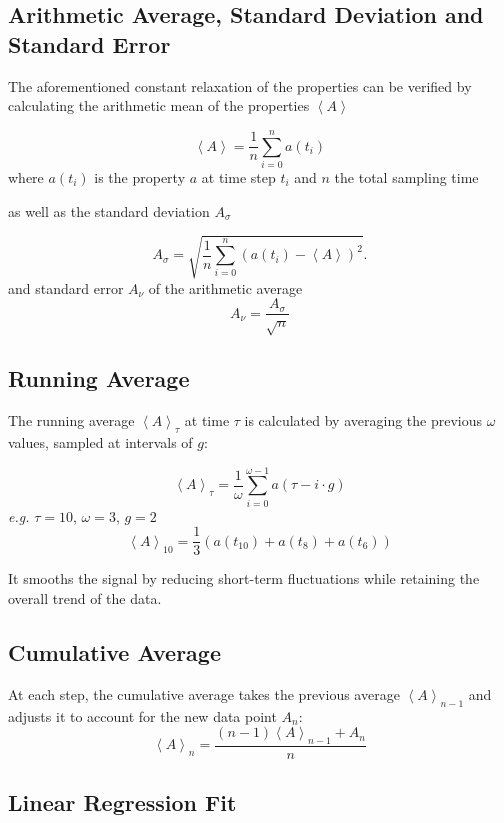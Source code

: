 \documentclass[
  letterpaper,
]{article}
\begin{document}
\hypertarget{arithmetic-average-standard-deviation-and-standard-error}{%
\subsection{Arithmetic Average, Standard Deviation and Standard
Error}\label{arithmetic-average-standard-deviation-and-standard-error}}

The aforementioned constant relaxation of the properties can be verified
by calculating the arithmetic mean of the properties
\(\left < A \right >\)

\[
\left < A \right >  = \frac{1}{n}\sum_{i=0}^{n} a(t_{i})
\] where \(a(t_{i})\) is the property \(a\) at time step \(t_i\) and
\(n\) the total sampling time

as well as the standard deviation \(A_{\sigma }\)

\[
A_{\sigma }= \sqrt{ \frac{1}{n}\sum_{i=0}^{n} (a(t_{i}) - \left < A \right > )^2}.
\] and standard error \(A_{\nu}\) of the arithmetic average \[
A_{\nu} = \frac{A_{\sigma }}{\sqrt{n}}
\]

\hypertarget{running-average}{%
\subsection{Running Average}\label{running-average}}

The running average \(\left < A \right >_{\tau}\) at time \(\tau\) is
calculated by averaging the previous \(\omega\) values, sampled at
intervals of \(g\):

\[
\left < A \right >_{\tau} = \frac{1}{\omega}\sum_{i=0}^{\omega - 1} a(\tau - i \cdot g)
\] \emph{e.g.} \(\tau=10\), \(\omega=3\), \(g=2\) \[
\left < A \right >_{10} = \frac{1}{3} (a(t_{10})+a(t_{8})+a(t_{6}))
\]

It smooths the signal by reducing short-term fluctuations while
retaining the overall trend of the data.

\hypertarget{cumulative-average}{%
\subsection{Cumulative Average}\label{cumulative-average}}

At each step, the cumulative average takes the previous average
\(\left < A \right >_{n-1}\) and adjusts it to account for the new data
point \(A_n\): \[
\left < A \right >_n = \frac{(n-1)\left < A \right >_{n-1} + A_n}{n}
\]

\hypertarget{linear-regression-fit}{%
\subsection{Linear Regression Fit}\label{linear-regression-fit}}
\end{document}
